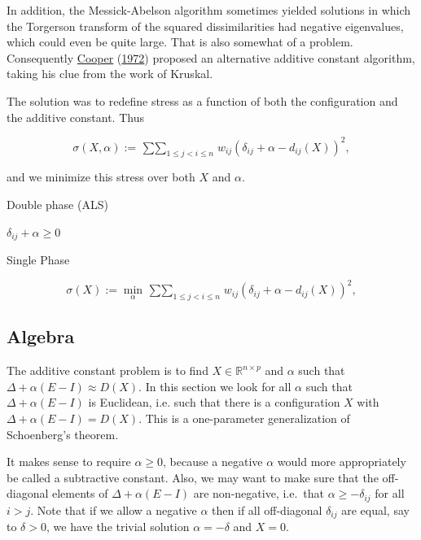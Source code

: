 \documentclass[
  12pt,
]{book}
\theoremstyle{definition}
\theoremstyle{definition}
\theoremstyle{definition}
\theoremstyle{definition}
\theoremstyle{remark}
\begin{document}
In addition, the Messick-Abelson algorithm sometimes yielded solutions
in which the Torgerson transform of the squared dissimilarities had
negative eigenvalues, which could even be quite large. That is also
somewhat of a problem. Consequently \protect\hyperlink{ref-cooper_72}{Cooper} (\protect\hyperlink{ref-cooper_72}{1972}) proposed an
alternative additive constant algorithm, taking his clue from the work
of Kruskal.

The solution was to redefine stress as a function of both the
configuration and the additive constant. Thus

\begin{equation}
\sigma(X,\alpha):=\mathop{\sum\sum}_{1\leq j<i\leq n}w_{ij}(\delta_{ij}+\alpha-d_{ij}(X))^2,
\label{eq:nmcooper1}
\end{equation}

and we minimize this stress over both \(X\) and \(\alpha\).

Double phase (ALS)

\(\delta_{ij}+\alpha\geq 0\)

Single Phase

\begin{equation}
\sigma(X):=\min_\alpha\mathop{\sum\sum}_{1\leq j<i\leq n}w_{ij}(\delta_{ij}+\alpha-d_{ij}(X))^2,
\label{eq:nmcooper2}
\end{equation}

\hypertarget{exactad}{%
\subsection{Algebra}\label{exactad}}

The additive constant problem is to find
\(X\in\mathbb{R}^{n\times p}\) and \(\alpha\) such that
\(\Delta+\alpha(E-I)\approx D(X)\). In this section we look for
all \(\alpha\) such that \(\Delta+\alpha(E-I)\) is Euclidean, i.e.
such that there is a configuration \(X\) with \(\Delta+\alpha(E-I)=D(X)\).
This is a one-parameter generalization of Schoenberg's theorem.

It makes sense to require \(\alpha\geq 0\), because a negative
\(\alpha\) would more appropriately be called a subtractive constant.
Also, we may want to make sure that the off-diagonal elements of \(\Delta+\alpha(E-I)\) are non-negative, i.e.~that \(\alpha\geq-\delta_{ij}\) for all \(i>j\). Note that if we allow a negative \(\alpha\) then if all off-diagonal \(\delta_{ij}\) are equal, say to \(\delta>0\), we have the trivial solution \(\alpha=-\delta\) and \(X=0\).
\end{document}
